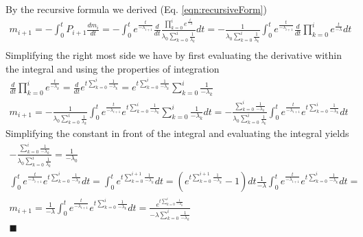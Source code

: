 \documentclass[12pt]{article}
\begin{document}
By the recursive formula we derived (Eq. \ref{eqn:recursiveForm})
\begin{equation}
\begin{split}
m_{i+1} = -\int_0^t P_{i+1}\frac{dm_i}{dt} = -\int_0^t e^{\frac{t}{-\lambda_{i+1}}}\frac{d}{dt}\frac{\prod_{k=0}^ie^{\frac{t}{-\lambda}}}{\lambda_0\sum_{k=0}^i\frac{1}{\lambda_k}}dt = -\frac{1}{\lambda_0\sum_{k=0}^i\frac{1}{\lambda_k}}\int_0^t e^{\frac{t}{-\lambda_{i+1}}}\frac{d}{dt}\prod_{k=0}^ie^{\frac{t}{-\lambda}}dt\\
\end{split}
\end{equation}
Simplifying the right most side we have by first evaluating the derivative within the integral and using the properties of integration
\begin{equation}
\begin{split}
\frac{d}{dt}\prod_{k=0}^ie^{\frac{t}{-\lambda_k}} = \frac{d}{dt}e^{t\sum_{k=0}^i\frac{1}{-\lambda_k}} = e^{t\sum_{k=0}^i\frac{1}{-\lambda_k}}\sum_{k=0}^i\frac{1}{-\lambda_k}\\
m_{i+1} = -\frac{1}{\lambda_0\sum_{k=0}^i\frac{1}{\lambda_k}}\int_0^t e^{\frac{t}{-\lambda_{i+1}}}e^{t\sum_{k=0}^i\frac{1}{-\lambda_k}}\sum_{k=0}^i\frac{1}{-\lambda_k}dt = -\frac{\sum_{k=0}^i\frac{1}{-\lambda_k}}{\lambda_0\sum_{k=0}^i\frac{1}{\lambda_k}}\int_0^t e^{\frac{t}{-\lambda_{i+1}}}e^{t\sum_{k=0}^i\frac{1}{-\lambda_k}}dt
\end{split}
\end{equation}
Simplifying the constant in front of the integral and evaluating the integral yields 
\begin{equation}
\begin{split}
-\frac{\sum_{k=0}^i\frac{1}{-\lambda_k}}{\lambda_0\sum_{k=0}^i\frac{1}{\lambda_k}} = \frac{1}{-\lambda_0}\\
\int_0^t e^{\frac{t}{-\lambda_{i+1}}}e^{t\sum_{k=0}^i\frac{1}{-\lambda_k}}dt = \int_0^t e^{t\sum_{k=0}^{i+1}\frac{1}{-\lambda_k}}dt = (e^{t\sum_{k=0}^{i+1}\frac{1}{-\lambda_k}}-1)dt  
\frac{1}{-\lambda}\int_0^t e^{\frac{t}{-\lambda_{i+1}}}e^{t\sum_{k=0}^i\frac{1}{-\lambda_k}}dt =  \\
m_{i+1} = \frac{1}{-\lambda}\int_0^t e^{\frac{t}{-\lambda_{i+1}}}e^{t\sum_{k=0}^i\frac{1}{-\lambda_k}}dt = \frac{e^{t\sum_{k=0}^i\frac{1}{-\lambda_k}}}{-\lambda\sum_{k=0}^i\frac{1}{-\lambda_k}}\\
\blacksquare
\end{split}
\end{equation}
\end{document}
